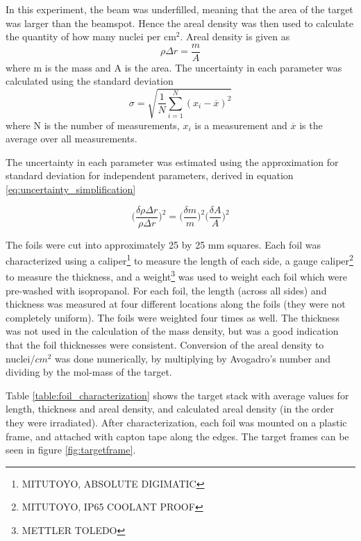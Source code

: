 \documentclass[a4paper,11pt,twoside]{book}
\begin{document}
\noindent
In this experiment, the beam was underfilled, meaning that the area of the target was larger than the beamspot. Hence the areal density was then used to calculate the quantity of how many nuclei per cm$^2$. Areal density is given as 
\begin{equation}
    \rho \Delta r = \frac{m}{A}
\end{equation}
\noindent
where m is the mass and A is the area. The uncertainty in each parameter was calculated using the standard deviation
\begin{equation}
    \sigma = \sqrt{\frac{1}{N}\sum_{i=1}^N (x_i - \overline{x})^2}
\end{equation}
\noindent
where N is the number of measurements, $x_i$ is a measurement and $\overline{x}$ is the average over all measurements. 

\noindent
The uncertainty in each parameter was estimated using the approximation for standard deviation for independent parameters, derived in equation \ref{eq:uncertainty_simplification}

\begin{equation}
    \Big(\frac{\delta \rho \Delta r}{\rho \Delta r}\Big)^2= \Big(\frac{\delta m}{m}\Big)^2 \Big(\frac{\delta A}{A}\Big)^2
\end{equation}

\noindent 
The foils were cut into approximately 25 by 25 mm squares. Each foil was characterized using a caliper\footnote{MITUTOYO, ABSOLUTE DIGIMATIC} to measure the length of each side, a gauge caliper\footnote{MITUTOYO, IP65 COOLANT PROOF} to measure the thickness, and a weight\footnote{METTLER TOLEDO} was used to weight each foil which were pre-washed with isopropanol. For each foil, the length (across all sides) and thickness was measured at four different locations along the foils (they were not completely uniform). The foils were weighted four times as well. The thickness was not used in the calculation of the mass density, but was a good indication that the foil thicknesses were consistent. Conversion of the areal density to nuclei/$cm^2$ was done numerically, by multiplying by Avogadro's number and dividing by the mol-mass of the target.

\noindent
Table \ref{table:foil_characterization} shows the target stack with average values for length, thickness and areal density, and calculated areal density (in the order they were irradiated). After characterization, each foil was mounted on a plastic frame, and attached with capton tape along the edges. The target frames can be seen in figure \ref{fig:targetframe}. 
\end{document}
